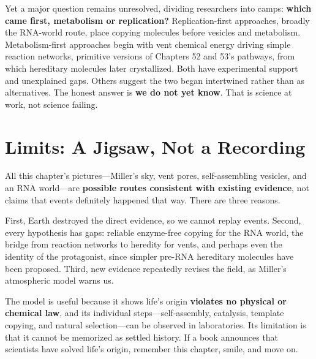 Yet a major question remains unresolved, dividing researchers into camps: \textbf{which came first, metabolism or replication?} Replication-first approaches, broadly the RNA-world route, place copying molecules before vesicles and metabolism. Metabolism-first approaches begin with vent chemical energy driving simple reaction networks, primitive versions of Chapters 52 and 53's pathways, from which hereditary molecules later crystallized. Both have experimental support and unexplained gaps. Others suggest the two began intertwined rather than as alternatives. The honest answer is \textbf{we do not yet know}. That is science at work, not science failing.

\section{Limits: A Jigsaw, Not a Recording}

All this chapter's pictures---Miller's sky, vent pores, self-assembling vesicles, and an RNA world---are \textbf{possible routes consistent with existing evidence}, not claims that events definitely happened that way. There are three reasons.

First, Earth destroyed the direct evidence, so we cannot replay events. Second, every hypothesis has gaps: reliable enzyme-free copying for the RNA world, the bridge from reaction networks to heredity for vents, and perhaps even the identity of the protagonist, since simpler pre-RNA hereditary molecules have been proposed. Third, new evidence repeatedly revises the field, as Miller's atmospheric model warns us.

The model is useful because it shows life's origin \textbf{violates no physical or chemical law}, and its individual steps---self-assembly, catalysis, template copying, and natural selection---can be observed in laboratories. Its limitation is that it cannot be memorized as settled history. If a book announces that scientists have solved life's origin, remember this chapter, smile, and move on.

